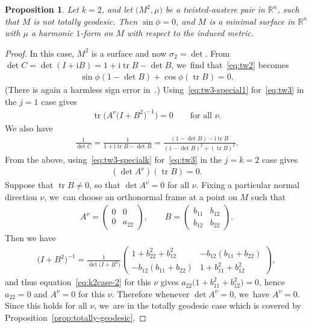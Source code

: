 \documentclass[pdftex]{sigma}
\def\R{\mathbb{R}}
\def\ri{\mathrm{i}}
\def\tr{\operatorname{tr}}
\newtheorem{Proposition}[Theorem]{Proposition}
\numberwithin{equation}{section}
\begin{document}
\begin{Proposition} \label{prop:k2}
Let $k=2$, and let $\big(M^2, \mu\big)$ be a twisted-austere pair in $\R^n$, such that $M$ is not totally geodesic. Then $\sin \phi = 0$, and $M$ is a minimal surface in $\R^n$ with $\mu$ a harmonic $1$-form on $M$ with respect to the induced metric.
\end{Proposition}
\begin{proof}
In this case, $M^2$ is a surface and now $\sigma_2 = \det$. From $\det C = \det (I + \ri B) = 1 + \ri \tr B - \det B$, we~find that~\eqref{eq:tw2} becomes
\begin{gather} \label{eq:k2case-1}
\sin \phi (1 - \det B) + \cos \phi (\tr B) = 0.
\end{gather}
(There is again a harmless sign error in~\cite[equation (2.15)]{KL}.) Using~\eqref{eq:tw3-special1} for~\eqref{eq:tw3} in the $j=1$ case gives
\begin{gather} \label{eq:k2case-2}
\tr \big(A^{\nu} \big(I + B^2\big)^{-1}\big) = 0 \qquad \text{for all $\nu$}.
\end{gather}
We also have
\begin{gather*}
\frac{1}{\det C} = \frac{1}{1 + \ri \tr B - \det B} = \frac{(1 - \det B) - \ri \tr B}{(1- \det B)^2 + (\tr B)^2}.
\end{gather*}
From the above, using~\eqref{eq:tw3-specialk} for~\eqref{eq:tw3} in the $j=k=2$ case gives
\begin{gather} \label{eq:k2case-3}
(\det A^{\nu}) (\tr B) = 0.
\end{gather}
Suppose that $\tr B \ne 0$, so that $\det A^{\nu} = 0$ for all $\nu$. Fixing a particular normal direction $\nu$, we~can choose an orthonormal frame at a point on $M$ such that
\begin{gather*}
A^{\nu} = \begin{pmatrix} 0 & 0 \\ 0 & a_{22} \end{pmatrix}, \qquad
B = \begin{pmatrix} b_{11} & b_{12} \\ b_{12} & b_{22} \end{pmatrix}.
\end{gather*}
Then we have
\begin{gather*}
\big(I + B^2\big)^{-1} = \frac{1}{\det \big(I + B^2\big)}
\begin{pmatrix} 1 + b_{22}^2 + b_{12}^2 & -b_{12}(b_{11} + b_{22}) \\ -b_{12}(b_{11} + b_{22}) & 1 + b_{11}^2 + b_{12}^2 \end{pmatrix},
\end{gather*}
and thus equation~\eqref{eq:k2case-2} for this $\nu$ gives $a_{22} \big(1 + b_{11}^2 + b_{12}^2\big) = 0$, hence $a_{22} = 0$ and $A^{\nu} = 0$ for this $\nu$.
Therefore whenever $\det A^{\nu} = 0$, we~have $A^{\nu} = 0$.
 Since this holds for all $\nu$, we~are in the totally geodesic case which is covered by Proposition~\ref{prop:totally-geodesic}.


\end{proof}
\end{document}
